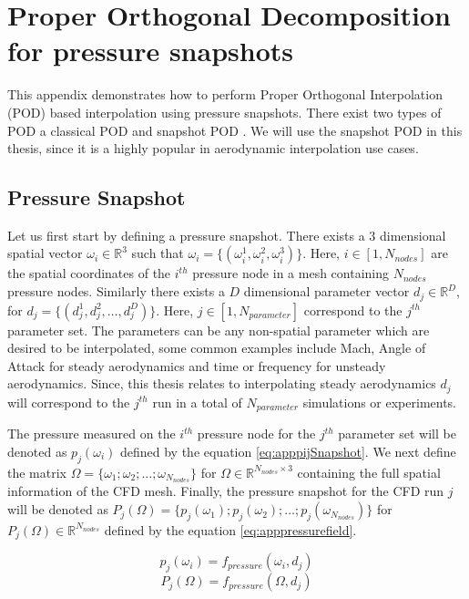 \chapter{Proper Orthogonal Decomposition for pressure snapshots}\label{appPODI}
This appendix demonstrates how to perform Proper Orthogonal Interpolation (POD) based interpolation using pressure snapshots. There exist two types of POD a classical POD \cite{gurvich1969atmospheric} and snapshot POD \cite{romanowski1996reduced}. We will use the snapshot POD in this thesis, since it is a highly popular in aerodynamic interpolation use cases. 

\section{Pressure Snapshot}
Let us first start by defining a pressure snapshot. There exists a \(3\) dimensional spatial vector \(\omega_{i} \in  \mathbb{R}^{3}\) such that \(\omega_{i} = \{(\omega_{i}^{1}, \omega_{i}^{2}, \omega_{i}^{3})\}\). Here, \(i \in [1,N_{nodes}] \) are the spatial coordinates of the \(i^{th}\) pressure node in a mesh containing \(N_{nodes}\) pressure nodes. Similarly there exists a \(D\) dimensional parameter vector \(d_{j} \in  \mathbb{R}^{D}\), for \(d_{j} = \{(d_{j}^{1}, d_{j}^{2}, \ldots ,d_{j}^{D})\}\). Here,   \(j \in [1,N_{parameter}] \) correspond to the \(j^{th}\) parameter set. The parameters can be any non-spatial parameter which are desired to be interpolated, some common examples include Mach, Angle of Attack for steady aerodynamics and time or frequency for unsteady aerodynamics. Since, this thesis relates to interpolating steady aerodynamics \(d_{j}\) will correspond to the \(j^{th}\) run in a total of \(N_{parameter}\) simulations or experiments. 

The pressure measured on the \(i^{th}\) pressure node for the \(j^{th}\) parameter set will be denoted as \(p_{j}(\omega_{i})\) defined by the equation \ref{eq:apppijSnapshot}. We next define the matrix \(\Omega = \{\omega_{1}; \omega_{2}; \ldots ; \omega_{N_{nodes}}\}\) for \(\Omega \in \mathbb{R}^{N_{nodes} \times 3}\) containing the full spatial information of the CFD mesh. Finally, the pressure snapshot for the CFD run \(j\) will be denoted as \(P_{j}(\Omega) = \{p_{j}(\omega_{1}); p_{j}(\omega_{2}); \ldots ; p_{j}(\omega_{N_{nodes}})\}\) for \(P_{j}(\Omega) \in \mathbb{R}^{N_{nodes}}\) defined by the equation \ref{eq:apppressurefield}.

\begin{equation} \label{eq:apppijSnapshot}
p_{j}(\omega_{i}) = f_{pressure}(\omega_{i}, d_{j})
\end{equation} 
\begin{equation}\label{eq:apppressurefield}
P_{j}(\Omega) = f_{pressure}(\Omega, d_{j})
\end{equation} 

